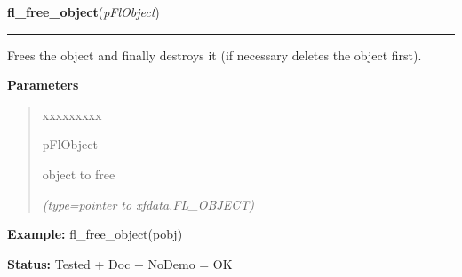 \hspace{.8\funcindent}\begin{boxedminipage}{\funcwidth}

    \raggedright \textbf{fl\_free\_object}(\textit{pFlObject})

    \vspace{-1.5ex}

    \rule{\textwidth}{0.5\fboxrule}
\setlength{\parskip}{2ex}
    Frees the object and finally destroys it (if necessary deletes the 
    object first).

\setlength{\parskip}{1ex}
      \textbf{Parameters}
      \vspace{-1ex}

      \begin{quote}
        \begin{Ventry}{xxxxxxxxx}

          \item[pFlObject]

          object to free

            {\it (type=pointer to xfdata.FL\_OBJECT)}

        \end{Ventry}

      \end{quote}

\textbf{Example:} fl\_free\_object(pobj)



\textbf{Status:} Tested + Doc + NoDemo = OK



    \end{boxedminipage}

    \label{xformslib:flbasic:fl_delete_object}

    \vspace{0.5ex}

